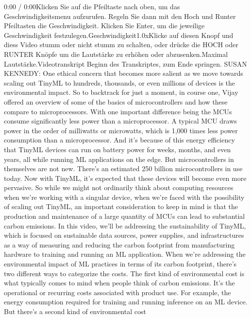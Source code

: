 {{{{{{{{    0:00 / 0:00Klicken Sie auf die Pfeiltaste nach oben, um das Geschwindigkeitsmenu aufzurufen. Regeln Sie dann mit den Hoch und Runter Pfeiltasten die Geschwindigkeit. Klicken Sie Enter, um die jeweilige Geschwindigkeit festzulegen.Geschwindigkeit1.0xKlicke auf diesen Knopf und diess Video stumm oder nicht stumm zu schalten, oder drücke die HOCH oder RUNTER Knöpfe um die Lautstärke zu erhöhen oder abzusenken.Maximal Lautstärke.Videotranskript
    Beginn des Transkriptes, zum Ende springen.
    SUSAN KENNEDY: One ethical concern that becomes more salient
    as we move towards scaling out TinyML to hundreds, thousands,
    or even millions of devices is the environmental impact.
    So to backtrack for just a moment, in course one,
    Vijay offered an overview of some of the basics of microcontrollers
    and how these compare to microprocessors.
    With one important difference being the MCUs
    consume significantly less power than a microprocessor.
    A typical MCU draws power in the order of milliwatts or microwatts,
    which is 1,000 times less power consumption than a microprocessor.
    And it's because of this energy efficiency that TinyML devices can
    run on battery power for weeks, months, and even years,
    all while running ML applications on the edge.
    But microcontrollers in themselves are not new.
    There's an estimated 250 billion microcontrollers in use today.
    Now with TinyML, it's expected that these devices
    will become even more pervasive.
    So while we might not ordinarily think about computing resources
    when we're working with a singular device,
    when we're faced with the possibility of scaling out TinyML,
    an important consideration to keep in mind
    is that the production and maintenance of a large quantity of MCUs
    can lead to substantial carbon emissions.
    In this video, we'll be addressing the sustainability of TinyML,
    which is focused on sustainable data sources, power
    supplies, and infrastructures as a way of measuring and reducing the carbon
    footprint from manufacturing hardware to training and running an ML application.
    When we're addressing the environmental impact of ML practices
    in terms of its carbon footprint, there's two different ways
    to categorize the costs.
    The first kind of environmental cost is what
    typically comes to mind when people think of carbon emissions.
    It's the operational or recurring costs associated with product use.
    For example, the energy consumption required for training and running
    inference on an ML device.
    But there's a second kind of environmental cost
}}}}}}}}
